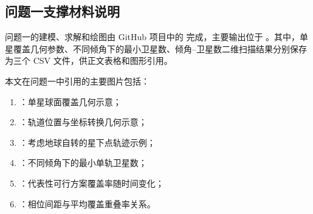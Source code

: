 \documentclass[withoutpreface,bwprint]{cumcmthesis} %
\begin{document}
\newpage
\begin{appendices}

\section{问题一支撑材料说明}
问题一的建模、求解和绘图由 GitHub 项目中的  完成，主要输出位于 。其中，单星覆盖几何参数、不同倾角下的最小卫星数、倾角--卫星数二维扫描结果分别保存为三个 CSV 文件，供正文表格和图形引用。

本文在问题一中引用的主要图片包括：
\begin{enumerate}
    \item {}：单星球面覆盖几何示意；
    \item {}：轨道位置与坐标转换几何示意；
    \item {}：考虑地球自转的星下点轨迹示例；
    \item {}：不同倾角下的最小单轨卫星数；
    \item {}：代表性可行方案覆盖率随时间变化；
    \item {}：相位间距与平均覆盖重叠率关系。
\end{enumerate}
\end{appendices}
\end{document}
